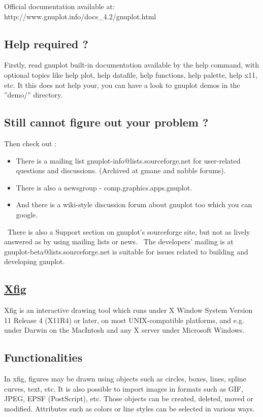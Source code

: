 \documentclass[a4paper, 12pt]{article}
\begin{document}
Official documentation available at: http://www.gnuplot.info/docs\_4.2/gnuplot.html	
	
\subsection{Help required ?}
Firstly, read gnuplot built-in documentation available by the help command, with optional
topics like help plot, help datafile, help functions, help palette, help x11, etc. It this does not help your, you can have a look to gnuplot demos in the ”demo/” directory.

\subsection{Still cannot figure out your problem ?}
Then check out :
\begin{itemize}
\item There is a mailing list gnuplot-info@lists.sourceforge.net for user-related questions and discussions. (Archived at gmane and nabble forums).
\item There is also a newsgroup - comp.graphics.apps.gnuplot.
\item And there is a wiki-style discussion forum about gnuplot too which you can google.
\end{itemize}
\
There is also a Support section on gnuplot's sourceforge site, but not as lively answered as by using mailing lists or news.
\
The developers' mailing is at gnuplot-beta@lists.sourceforge.net is suitable for issues related to building and developing gnuplot.

\begin{center}
\section{\underline{Xfig}}
\end{center}

Xfig is an interactive drawing tool which runs under X Window System Version 11 Release 4 (X11R4) or later, on most UNIX-compatible platforms, and e.g. under 
Darwin on the MacIntosh and any X server under Microsoft Windows.\\

\subsection{Functionalities}
In xfig, figures may be drawn using objects such as circles, boxes, lines, spline curves, text, etc. It is also possible to import images in formats such as GIF, JPEG, EPSF (PostScript), etc. Those objects can be created, deleted, moved or modified. 
Attributes such as colors or line styles can be selected in various ways.
\end{document}

